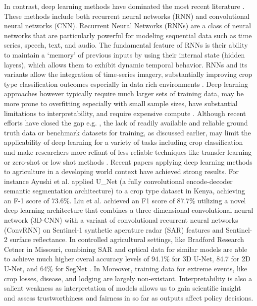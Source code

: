\documentclass[
  journal,
  twocolumn]{IEEEtran}
\begin{document}
In contrast, deep learning methods have dominated the most recent
literature \citep{agriculture13050965, hohl2024recent}. These methods
include both recurrent neural networks (RNN) and convolutional neural
networks (CNN). Recurrent Neural Networks (RNNs) are a class of neural
networks that are particularly powerful for modeling sequential data
such as time series, speech, text, and audio. The fundamental feature of
RNNs is their ability to maintain a `memory' of previous inputs by using
their internal state (hidden layers), which allows them to exhibit
dynamic temporal behavior. RNNs and its variants allow the integration
of time-series imagery, substantially improving crop type classification
outcomes especially in data rich environments
\citep{agriculture13050965, camps2021deep}. Deep learning approaches
however typically require much larger sets of training data, may be more
prone to overfitting especially with small sample sizes, have
substantial limitations to interpretability, and require expensive
compute
\citep{hohl2024recent, rs13132591, agriculture13050965, LI2023103345, MA2019166}.
Although recent efforts have closed the gap e.g.
\citep{tseng2021cropharvest}, the lack of readily available and reliable
ground truth data or benchmark datasets for training, as discussed
earlier, may limit the applicability of deep learning for a variety of
tasks including crop classification and make researchers more reliant of
less reliable techniques like transfer learning or zero-shot or low shot
methods \citep{owusu2024towards, LI2023103345, MA2019166}. Recent papers
applying deep learning methods to agriculture in a developing world
context have achieved strong results. For instance Ayushi et al.
\citet{buttar2024satellite} applied U\_Net (a fully convolutional
encode-decoder semantic segmentation architecture) to a crop type
dataset in Kenya, achieving an F-1 score of 73.6\%. Liu et al.
\citet{liu2024enhanced} achieved an F1 score of 87.7\% utilizing a novel
deep learning architecture that combines a three dimensional
convolutional neural network (3D-CNN) with a variant of convolutional
recurrent neural networks (ConvRNN) on Sentinel-1 synthetic aperature
radar (SAR) features and Sentinel-2 surface reflectance. In controlled
agricultural settings, like Bradford Research Cetner in Missouri,
combining SAR and optical data for similar models are able to achieve
much higher overal accuracy levels of 94.1\% for 3D U-Net, 84.7 for 2D
U-Net, and 64\% for SegNet \citep{ADRIAN2021215}. In Moreover, training
data for extreme events, like crop losses, disease, and lodging are
largely non-existant. Interpretability is also a salient weakness as
interpretation of models allows us to gain scientific insight and assess
trustworthiness and fairness in so far as outputs affect policy
decisions.
\end{document}
